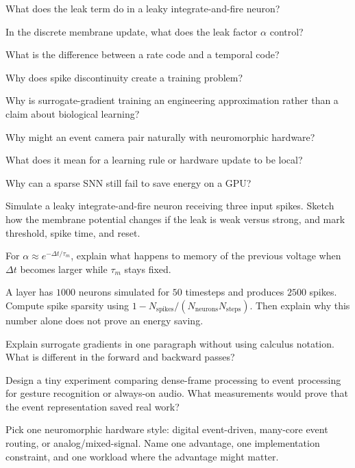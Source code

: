 \begin{conceptquestions}
\item What does the leak term do in a leaky integrate-and-fire neuron?
\item In the discrete membrane update, what does the leak factor \(\alpha\) control?
\item What is the difference between a rate code and a temporal code?
\item Why does spike discontinuity create a training problem?
\item Why is surrogate-gradient training an engineering approximation rather than a claim about biological learning?
\item Why might an event camera pair naturally with neuromorphic hardware?
\item What does it mean for a learning rule or hardware update to be local?
\item Why can a sparse SNN still fail to save energy on a GPU\@?
\end{conceptquestions}

\begin{exercises}
\item Simulate a leaky integrate-and-fire neuron receiving three input spikes. Sketch how the membrane potential changes if the leak is weak versus strong, and mark threshold, spike time, and reset.
\item For \(\alpha \approx e^{-\Delta t/\tau_m}\), explain what happens to memory of the previous voltage when \(\Delta t\) becomes larger while \(\tau_m\) stays fixed.
\item A layer has \(1000\) neurons simulated for \(50\) timesteps and produces \(2500\) spikes. Compute spike sparsity using \(1 - N_{\text{spikes}}/(N_{\text{neurons}}N_{\text{steps}})\). Then explain why this number alone does not prove an energy saving.
\item Explain surrogate gradients in one paragraph without using calculus notation. What is different in the forward and backward passes?
\item Design a tiny experiment comparing dense-frame processing to event processing for gesture recognition or always-on audio. What measurements would prove that the event representation saved real work?
\item Pick one neuromorphic hardware style: digital event-driven, many-core event routing, or analog/mixed-signal. Name one advantage, one implementation constraint, and one workload where the advantage might matter.
\end{exercises}
